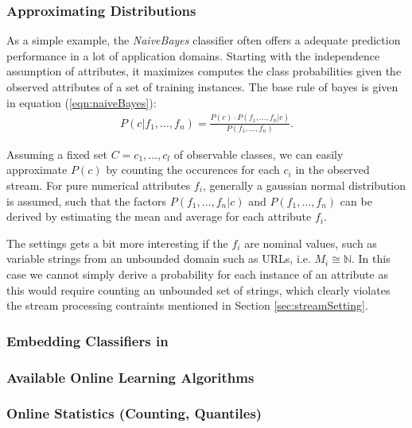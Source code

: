 \subsubsection*{Approximating Distributions}
As a simple example, the {\em NaiveBayes}\cite{NB} classifier often
offers a adequate prediction performance in a lot of application
domains. Starting with the independence assumption of attributes, it
maximizes computes the class probabilities given the observed
attributes of a set of training instances. The base rule of bayes is
given in equation (\ref{eqn:naiveBayes}):
\begin{eqnarray}
  P(c | f_1,\ldots,f_n ) = \frac{P(c)\cdot P(f_1,\ldots,f_n|c)}{P(f_1,\ldots,f_n)}.\label{eqn:naiveBayes}
\end{eqnarray}

Assuming a fixed set $C = {c_1,\ldots,c_l}$ of observable classes, we
can easily approximate $P(c)$ by counting the occurences for each
$c_i$ in the observed stream. For pure numerical attributes $f_i$,
generally a gaussian normal distribution is assumed, such that the
factors $P(f_1,\ldots,f_n|c)$ and $P(f_1,\ldots,f_n)$ can be derived
by estimating the mean and average for each attribute $f_i$.

The settings gets a bit more interesting if the $f_i$ are nominal
values, such as variable strings from an unbounded domain such as
URLs, i.e. $M_i \cong \mathbb{N}$. In this case we cannot simply
derive a probability for each instance of an attribute as this would
require counting an unbounded set of strings, which clearly violates
the stream processing contraints mentioned in Section
\ref{sec:streamSetting}.

\subsubsection{Embedding Classifiers in \streams}


\subsubsection{Available Online Learning Algorithms}

\subsubsection*{Online Statistics (Counting, Quantiles)}

